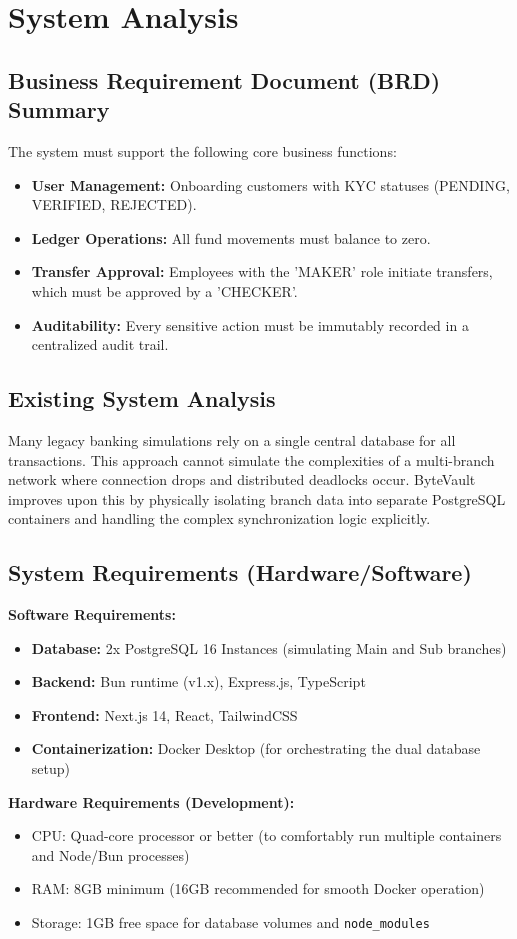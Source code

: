 \chapter{System Analysis}

\section{Business Requirement Document (BRD) Summary}
The system must support the following core business functions:
\begin{itemize}
    \item \textbf{User Management:} Onboarding customers with KYC statuses (PENDING, VERIFIED, REJECTED).
    \item \textbf{Ledger Operations:} All fund movements must balance to zero.
    \item \textbf{Transfer Approval:} Employees with the 'MAKER' role initiate transfers, which must be approved by a 'CHECKER'.
    \item \textbf{Auditability:} Every sensitive action must be immutably recorded in a centralized audit trail.
\end{itemize}

\section{Existing System Analysis}
Many legacy banking simulations rely on a single central database for all transactions. This approach cannot simulate the complexities of a multi-branch network where connection drops and distributed deadlocks occur. ByteVault improves upon this by physically isolating branch data into separate PostgreSQL containers and handling the complex synchronization logic explicitly.

\section{System Requirements (Hardware/Software)}
\textbf{Software Requirements:}
\begin{itemize}
    \item \textbf{Database:} 2x PostgreSQL 16 Instances (simulating Main and Sub branches)
    \item \textbf{Backend:} Bun runtime (v1.x), Express.js, TypeScript
    \item \textbf{Frontend:} Next.js 14, React, TailwindCSS
    \item \textbf{Containerization:} Docker Desktop (for orchestrating the dual database setup)
\end{itemize}

\textbf{Hardware Requirements (Development):}
\begin{itemize}
    \item CPU: Quad-core processor or better (to comfortably run multiple containers and Node/Bun processes)
    \item RAM: 8GB minimum (16GB recommended for smooth Docker operation)
    \item Storage: 1GB free space for database volumes and \texttt{node\_modules}
\end{itemize}
